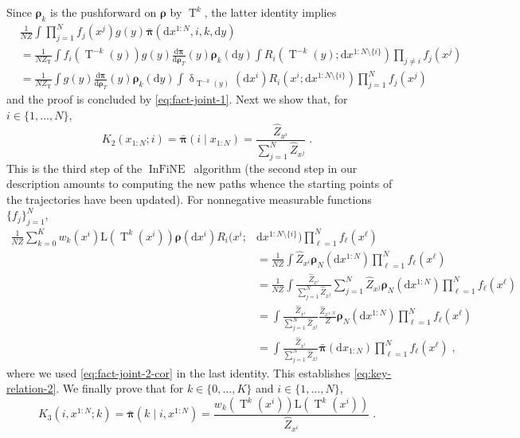 \documentclass{article}
\def\IFIS{\ensuremath{\operatorname{InFiNE}}}
\def\transfo{\operatorname{T}}
\def\rmd{\operatorname{d}\hspace{-2pt}}
\newcommand{\chunk}[3]{#1_{#2:#3}}
\def\rmd{\mathrm{d}}
\def\eqsp{\,}
\def\eqsp{\;}
\newcommand{\1}{\mathds{1}}
\def\w{w}
\newcommand{\chunku}[3]{#1^{#2:#3}}
\newcommand{\chunkum}[4]{#1^{#2:#3 \setminus \{#4\}}}
\def\const{Z}
\newcommand{\estConstC}[1]{\widehat{Z}_{#1}}
\def\measpi{\boldsymbol{\pi}}
\def\measprop{\boldsymbol{\rho}}
\def\rmd{\mathrm{d}}
\def\likelihood{\mathrm{L}}
\def\bmeaspi{\bar{\measpi}}
\def\constT{\const_{\transfo}}
\begin{document}
Since $\measprop_k$ is the pushforward on $\measprop$ by $\transfo^k$, the latter identity implies
\begin{align*}
& \frac{1}{N \const} \int \prod_{j=1}^N f_j(x^j) g(y) \bmeaspi(\rmd \chunku{x}{1}{N},i,k,\rmd y) \\
& =\frac{1}{N \constT} \int f_i(\transfo^{-k}(y)) g(y) \frac{\rmd \measpi}{\rmd \measprop_T}(y) \measprop_k(\rmd y) \int R_i(\transfo^{-k}(y); \rmd \chunkum{x}{1}{N}{i}) \prod_{j \neq i} f_j(x^j) \\
&= \frac{1}{N \constT} \int g(y) \frac{\rmd \measpi}{\rmd \measprop_T}(y) \measprop_k(\rmd y) \int \updelta_{\transfo^{-k}(y)}(\rmd x^i)  R_i(x^i; \rmd \chunkum{x}{1}{N}{i}) \prod_{j=1}^N f_j(x^j)
\end{align*}
and the proof is concluded by \eqref{eq:fact-joint-1}. Next we show that, for $i \in \{1,\dots,N\}$,
\begin{equation}
\label{eq:key-relation-2}
K_{2}(\chunk{x}{1}{N}; i)= \bmeaspi(i \mid \chunk{x}{1}{N})=  \frac{\estConstC{x^i}}{\sum_{j=1}^N \estConstC{x^j}} \eqsp.
\end{equation}
This is the third step of the \IFIS\ algorithm (the second step in our description amounts to computing the new paths whence the starting points of the trajectories have been updated).
For nonnegative measurable functions $\{f_j\}_{j=1}^N$,
\begin{align*}
\frac{1}{N \const} \sum_{k=0}^K \w_k(x^i) \likelihood(\transfo^k(x^i)) \measprop(\rmd x^i) R_i(x^i;& \rmd \chunkum{x}{1}{N}{i}) \prod_{\ell=1}^N f_\ell(x^\ell)\\
&= \frac{1}{N \const} \int \estConstC{x^i} \measprop_N(\rmd \chunku{x}{1}{N}) \prod_{\ell=1}^N f_\ell(x^\ell) \\
&= \frac{1}{N \const} \int \frac{\estConstC{x^i}}{\sum_{j=1}^N \estConstC{x^j}} \sum_{j=1}^N \estConstC{x^j} \measprop_N(\rmd \chunku{x}{1}{N}) \prod_{\ell=1}^N f_\ell(x^\ell) \\
&=
\int \frac{\estConstC{x^i}}{\sum_{j=1}^N \estConstC{x^j}} \frac{\estConstC{\chunku{x}{1}{N}}}{\const} \measprop_N(\rmd \chunku{x}{1}{N}) \prod_{\ell=1}^N f_\ell(x^\ell) \\
&=  \int \frac{\estConstC{x^i}}{\sum_{j=1}^N \estConstC{x^j}} \bmeaspi(\rmd \chunk{x}{1}{N}) \prod_{\ell=1}^N f_\ell(x^\ell)\eqsp,
\end{align*}
where we used \eqref{eq:fact-joint-2-cor} in the last identity. This establishes \eqref{eq:key-relation-2}. We finally prove that for $k \in \{0,\dots,K\}$ and $i \in \{1,\dots,N\}$,
\begin{equation}
\label{eq:key-relation-3}
K_3(i,\chunku{x}{1}{N}; k)= \bmeaspi(k \mid i,\chunku{x}{1}{N})=   \frac{\w_k(\transfo^k(x^i)) \likelihood(\transfo^k(x^i))}{\estConstC{x^i}} \eqsp.
\end{equation}
\end{document}
